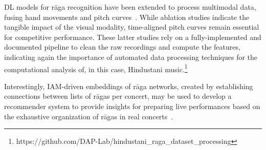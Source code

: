 \acrshort{DL} models for rāga recognition have been extended to process multimodal data, fusing hand movements and pitch curves~\citep{clayton-raga_classification,roychowdhury-raga}. While ablation studies indicate the tangible impact of the visual modality, time-aligned pitch curves remain essential for competitive performance. These latter studies rely on a fully-implemented and documented pipeline to clean the raw recordings and compute the features, indicating again the importance of automated data processing techniques for the computational analysis of, in this case, Hindustani music.\footnote{https://github.com/DAP-Lab/hindustani\_raga\_dataset\_processing}

Interestingly, \acrshort{IAM}-driven embeddings of rāga networks, created by establishing connections between lists of rāgas per concert, may be used to develop a recommender system to provide insights for preparing live performances based on the exhaustive organization of rāgas in real concerts~\citep{bagavathi-ragamai}.









